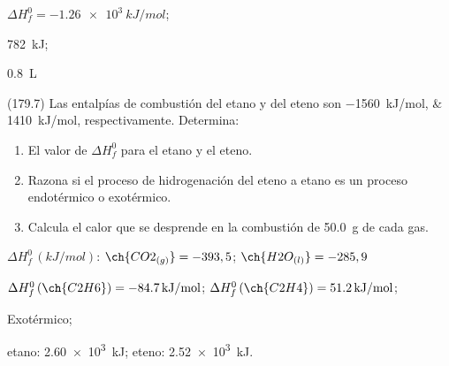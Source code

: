   \begin{solution}
    \begin{enumerate*}
      \item \( \Delta H^0_f = \SI{-1.26e3}{kJ/mol} \);
      \item \SI{782}{kJ};
      \item \SI{0.8}{\liter}
    \end{enumerate*}
  \end{solution}




  \begin{exercise}[
      tags    = {},
      topics  = {química, termodinámica, termoquímica},
      source  = {FQ 1B MGH 2016, p179, e7},
    ]
    (179.7) Las entalpías de combustión del etano y del eteno son
    \SIlist{-1560;1410}{kJ/mol}, respectivamente. Determina:
    \begin{enumerate}
      \item El valor de \( \Delta H^0_f \) para el etano y el eteno.
      \item Razona si el proceso de hidrogenación del eteno a etano
      es un proceso endotérmico o exotérmico.
      \item Calcula el calor que se desprende en la combustión de
      \SI{50.0}{\gram} de cada gas.
    \end{enumerate}

    \begin{gexdatos}
      \( \Delta H^0_f\,(\si{kJ/mol}) \): \( \ch{CO2_{(g)}} = -393,5 \); \( \ch{H2O_{(l)}} = -285,9 \)
    \end{gexdatos}
  \end{exercise}

  \begin{solution}
    \begin{enumerate*}
      \item \( \Delta H^0_f\,(\ch{C2H6})= \SI{-84,7}{kJ/mol} \); \( \Delta H^0_f\,(\ch{C2H4}) = \SI{51.2}{kJ/mol} \); \item Exotérmico; \item etano: \SI{2.60e3}{kJ}; eteno: \SI{2.52e3}{kJ}.
    \end{enumerate*}
  \end{solution}




